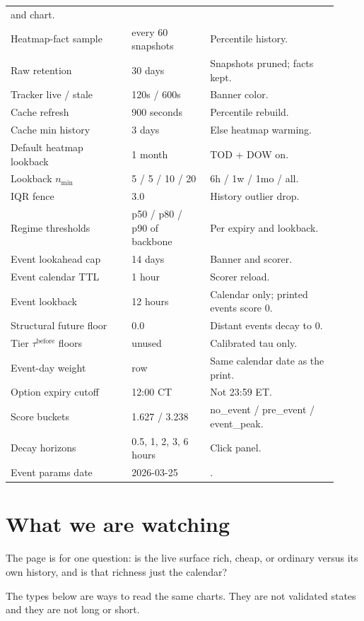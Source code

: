 \documentclass[11pt]{article}
\newcommand{\code}[1]{\texttt{\detokenize{#1}}}
\begin{document}
\begin{longtable}{@{}p{0.34\linewidth}p{0.22\linewidth}p{0.36\linewidth}@{}}
and chart. \\
Heatmap-fact sample & every 60 snapshots & Percentile history. \\
Raw retention & 30 days & Snapshots pruned; facts kept. \\
Tracker live / stale & 120s / 600s & Banner color. \\
Cache refresh & 900 seconds & Percentile rebuild. \\
Cache min history & 3 days & Else heatmap warming. \\
Default heatmap lookback & 1 month & TOD + DOW on. \\
Lookback \(n_{\min}\) & 5 / 5 / 10 / 20 & 6h / 1w / 1mo / all. \\
IQR fence & 3.0 & History outlier drop. \\
Regime thresholds & p50 / p80 / p90 of backbone & Per expiry and
lookback. \\
Event lookahead cap & 14 days & Banner and scorer. \\
Event calendar TTL & 1 hour & Scorer reload. \\
Event lookback & 12 hours & Calendar only; printed events score 0. \\
Structural future floor & 0.0 & Distant events decay to 0. \\
Tier \(\tau^{\mathrm{before}}\) floors & unused & Calibrated tau only. \\
Event-day weight & \code{1st} row & Same calendar date as the print. \\
Option expiry cutoff & 12:00 CT & Not 23:59 ET. \\
Score buckets & 1.627 / 3.238 & no\_event / pre\_event /
event\_peak. \\
Decay horizons & 0.5, 1, 2, 3, 6 hours & Click panel. \\
Event params date & 2026-03-25 & \code{event_params.json}. \\
\bottomrule
\end{longtable}


\section{What we are watching}

The page is for one question: is the live surface rich, cheap, or
ordinary versus its own history, and is that richness just the
calendar?

The types below are ways to read the same charts.  They are not
validated states and they are not long or short.
\end{document}
